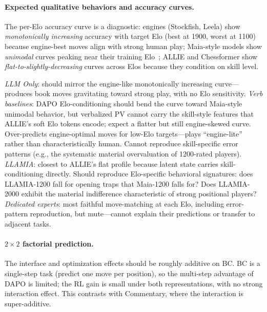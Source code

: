\paragraph{Expected qualitative behaviors and accuracy curves.}
The per-Elo accuracy curve is a diagnostic:
engines (Stockfish, Leela) show \emph{monotonically increasing} accuracy
with target Elo (best at 1900, worst at 1100) because engine-best moves
align with strong human play;
Maia-style models show \emph{unimodal} curves peaking near their training
Elo~\cite{mcilroy2022aligning};
ALLIE and Chessformer show \emph{flat-to-slightly-decreasing} curves across
Elos because they condition on skill level.

\emph{LLM Only}: should mirror the engine-like monotonically increasing
curve---produces book moves gravitating toward strong play, with no Elo
sensitivity.
\emph{Verb baselines}: DAPO Elo-conditioning should bend the curve toward
Maia-style unimodal behavior, but verbalized PV cannot carry the
skill-style features that ALLIE's soft Elo tokens encode; expect a flatter
but still engine-skewed curve.
Over-predicts engine-optimal moves for low-Elo targets---plays
``engine-lite'' rather than characteristically human.
Cannot reproduce skill-specific error patterns (e.g., the systematic
material overvaluation of 1200-rated players).
\emph{LLAMIA}: closest to ALLIE's flat profile because latent state carries
skill-conditioning directly.
Should reproduce Elo-specific behavioral signatures: does LLAMIA-1200 fall
for opening traps that Maia-1200 falls for?
Does LLAMIA-2000 exhibit the material indifference characteristic of strong
positional players?
\emph{Dedicated experts}: most faithful move-matching at each Elo, including
error-pattern reproduction, but mute---cannot explain their predictions or
transfer to adjacent tasks.

\paragraph{$2{\times}2$ factorial prediction.}
The interface and optimization effects should be roughly additive on BC\@.
BC is a single-step task (predict one move per position), so the multi-step
advantage of DAPO is limited; the RL gain is small under both
representations, with no strong interaction effect.
This contrasts with Commentary, where the interaction is super-additive.

